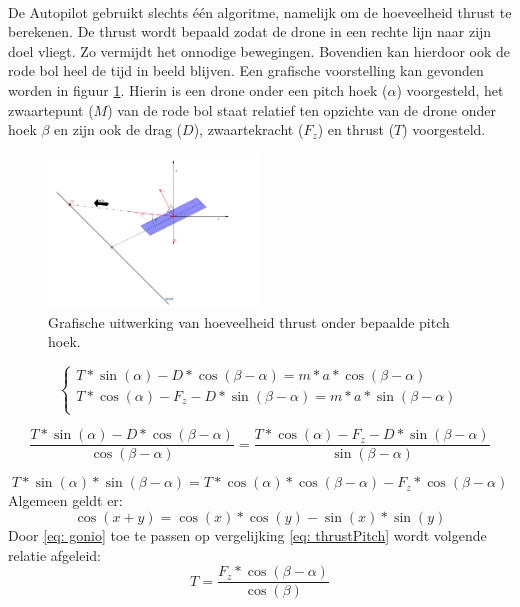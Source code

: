 \\
De Autopilot gebruikt slechts één algoritme, namelijk om de hoeveelheid thrust te berekenen. De thrust wordt bepaald zodat de drone in een rechte lijn naar zijn doel vliegt. Zo vermijdt het onnodige bewegingen. Bovendien kan hierdoor ook de rode bol heel de tijd in beeld blijven. Een grafische voorstelling kan gevonden worden in figuur \ref{fig:GrafischeUitwerkingVanHoeveelheidThrustOnderBepaaldePitch}. Hierin is een drone onder een pitch hoek (\(\alpha\)) voorgesteld, het zwaartepunt (\(M\)) van de rode bol staat relatief ten opzichte van de drone onder hoek \(\beta\) en zijn ook de drag (\(D\)), zwaartekracht (\(F_z\)) en thrust (\(T\)) voorgesteld.

\begin{figure}[h]
	\centering
	\includegraphics[width=0.5\textwidth]{GrafischeUitwerkingVanHoeveelheidThrustOnderBepaaldePitch.png}
	\caption{Grafische uitwerking van hoeveelheid thrust onder bepaalde pitch hoek.}
	\label{fig:GrafischeUitwerkingVanHoeveelheidThrustOnderBepaaldePitch}
\end{figure}

\begin{equation}
\begin{cases}
T*\sin(\alpha)-D*\cos(\beta-\alpha) = m*a*\cos(\beta-\alpha)\\
T*\cos(\alpha) - F_z - D*\sin(\beta-\alpha) = m*a*\sin(\beta-\alpha)\\
\end{cases}
\end{equation}

\begin{equation}
\frac{T*\sin(\alpha)-D*\cos(\beta-\alpha)}{\cos(\beta-\alpha)} = \frac{T*\cos(\alpha) - F_z - D*\sin(\beta-\alpha)}{\sin(\beta-\alpha)}
\end{equation}

\begin{equation} \label{eq: thrustPitch}
T*\sin(\alpha)*\sin(\beta-\alpha) = T*\cos(\alpha)*\cos(\beta-\alpha)- F_z*\cos(\beta-\alpha)
\end{equation}
Algemeen geldt er:
\begin{equation} \label{eq: gonio}
\cos(x+y) = \cos(x)*\cos(y)-\sin(x)*\sin(y)
\end{equation}
Door \ref{eq: gonio} toe te passen op vergelijking \ref{eq: thrustPitch} wordt volgende relatie afgeleid:
\begin{equation}
T = \frac{ F_z*\cos(\beta-\alpha)}{\cos(\beta)}
\end{equation}

